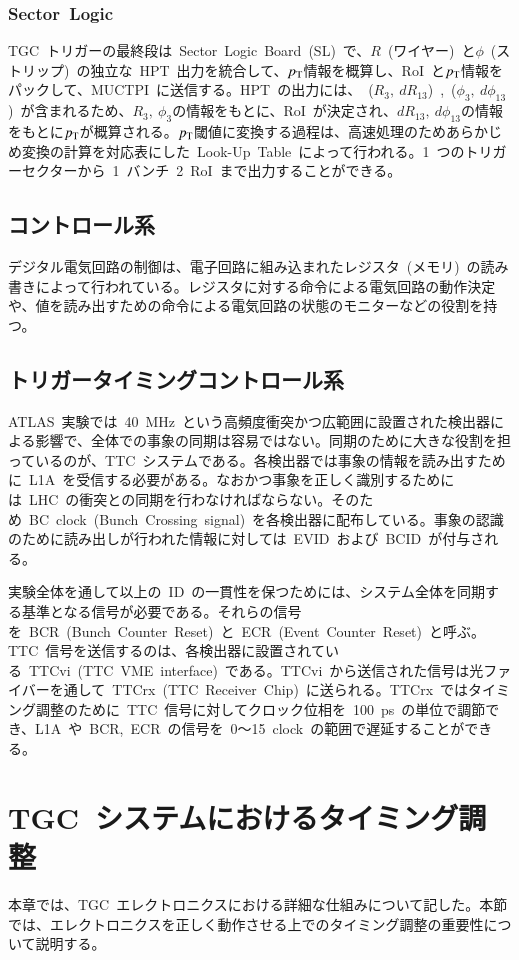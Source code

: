 \subsubsection{Sector~Logic}
TGC~トリガーの最終段は~Sector~Logic~Board~(SL)~で、$R$~(ワイヤー)~と$\phi$~(ストリップ)~の独立な~HPT~出力を統合して、$p_{\rm{T}}$情報を概算し、RoI~と$p_{\rm{T}}$情報をパックして、MUCTPI~に送信する。HPT~の出力には、~($R_{3},~dR_{13}$)~,~($\phi_{3},~d\phi_{13}$)~が含まれるため、$R_3,~\phi_3$の情報をもとに、RoI~が決定され、$dR_{13},~d\phi_{13}$の情報をもとに$p_{\rm{T}}$が概算される。$p_{\rm{T}}$閾値に変換する過程は、高速処理のためあらかじめ変換の計算を対応表にした~Look-Up~Table~によって行われる。1~つのトリガーセクターから~1~バンチ~2~RoI~まで出力することができる。

\subsection{コントロール系}
デジタル電気回路の制御は、電子回路に組み込まれたレジスタ~(メモリ)~の読み書きによって行われている。レジスタに対する命令による電気回路の動作決定や、値を読み出すための命令による電気回路の状態のモニターなどの役割を持つ。

\subsection{トリガータイミングコントロール系}
ATLAS~実験では~40~MHz~という高頻度衝突かつ広範囲に設置された検出器による影響で、全体での事象の同期は容易ではない。同期のために大きな役割を担っているのが、TTC~システムである。各検出器では事象の情報を読み出すために~L1A~を受信する必要がある。なおかつ事象を正しく識別するためには~LHC~の衝突との同期を行わなければならない。そのため~BC~clock~(Bunch~Crossing~signal)~を各検出器に配布している。事象の認識のために読み出しが行われた情報に対しては~EVID~および~BCID~が付与される。

実験全体を通して以上の~ID~の一貫性を保つためには、システム全体を同期する基準となる信号が必要である。それらの信号を~BCR~(Bunch~Counter~Reset)~と~ECR~(Event~Counter~Reset)~と呼ぶ。TTC~信号を送信するのは、各検出器に設置されている~TTCvi~(TTC~VME~interface)~である。TTCvi~から送信された信号は光ファイバーを通して~TTCrx~(TTC~Receiver~Chip)~に送られる。TTCrx~ではタイミング調整のために~TTC~信号に対してクロック位相を~100~ps~の単位で調節でき、L1A~や~BCR,~ECR~の信号を~0～15~clock~の範囲で遅延することができる。

\section{TGC~システムにおけるタイミング調整}
本章では、TGC~エレクトロニクスにおける詳細な仕組みについて記した。本節では、エレクトロニクスを正しく動作させる上でのタイミング調整の重要性について説明する。

